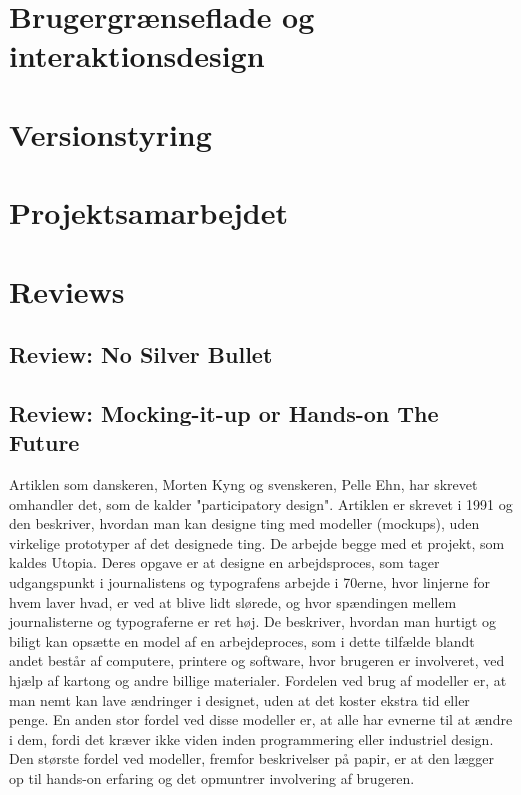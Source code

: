 \documentclass[a4paper,12pt]{article}
\begin{document}
\section{Brugergrænseflade og interaktionsdesign}

\section{Versionstyring}

\section{Projektsamarbejdet}

\section{Reviews}
\subsection{Review: No Silver Bullet}
\subsection{Review: Mocking-it-up or Hands-on The Future}
Artiklen som danskeren, Morten Kyng og svenskeren, Pelle Ehn, har skrevet omhandler det, som de kalder "participatory design". Artiklen er skrevet i 1991 og den beskriver, hvordan man kan designe ting med modeller (mockups), uden virkelige prototyper af det designede ting. De arbejde begge med et projekt, som kaldes Utopia. Deres opgave er at designe en arbejdsproces, som tager udgangspunkt i journalistens og typografens arbejde i 70erne, hvor linjerne for hvem laver hvad, er ved at blive lidt slørede, og hvor spændingen mellem journalisterne og typograferne er ret høj. De beskriver, hvordan man hurtigt og biligt kan opsætte en model af en arbejdeproces, som i dette tilfælde blandt andet består af computere, printere og software, hvor brugeren er involveret, ved hjælp af kartong og andre billige materialer. Fordelen ved brug af modeller er, at man nemt kan lave ændringer i designet, uden at det koster ekstra tid eller penge. En anden stor fordel ved disse modeller er, at alle har evnerne til at ændre i dem, fordi det kræver ikke viden inden programmering eller industriel design. Den største fordel ved modeller, fremfor beskrivelser på papir, er at den lægger op til hands-on erfaring og det opmuntrer involvering af brugeren.
\end{document}
